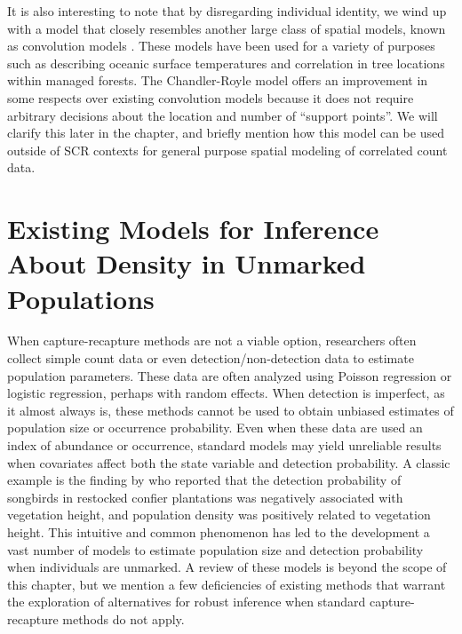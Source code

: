 It is also interesting to note that by disregarding individual
identity, we wind up with a model that closely resembles another large
class of spatial models, known as convolution models
\citep{wolpert_ickstadt:1998,higdon:1998}. These
models have been used for a variety of purposes such as describing oceanic
surface temperatures and correlation in tree locations within managed
forests. The Chandler-Royle model offers an improvement in
some respects over existing convolution models because it does not
require arbitrary decisions about the location and number of ``support
points''. We will clarify this later in the chapter, and briefly
mention how this model can be used outside of SCR contexts for general
purpose spatial modeling of correlated count data.


\section{Existing Models for Inference About Density in Unmarked Populations}
\label{Sect.existing-unmarked}

When capture-recapture methods are not a viable option, researchers
often collect simple count data or even detection/non-detection data
to estimate population parameters. These data are often analyzed using
Poisson regression or logistic regression, perhaps with random
effects. When detection is imperfect, as it almost always is,
these methods cannot be used to obtain unbiased estimates of
population size or occurrence probability. Even when these data are
used an index of abundance or occurrence, standard models may yield
unreliable results when covariates affect both the state variable and
detection probability. A classic example is the finding by
\citet{bibby_buckland:1987} who reported that the detection
probability of
songbirds in restocked confier plantations was negatively associated
with vegetation height, and population density was positively related to
vegetation height. This intuitive and common phenomenon has led to the
development a vast number of models to estimate population size and
detection probability when individuals are unmarked. A review of these
models is beyond the scope of this
chapter, but we mention a few deficiencies of existing methods
that warrant the exploration of alternatives for robust inference when
standard capture-recapture methods do not apply.

